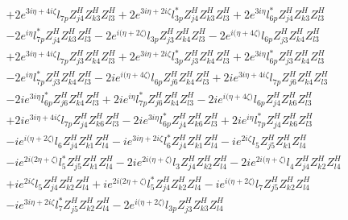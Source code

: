 \begin{align}
 &+2 e^{3 i \eta +4 i \zeta } l_{7p} Z_{{j 4}}^{H} Z_{{k 3}}^{H} Z_{{l 3}}^{H} +2 e^{3 i \eta +2 i \zeta } l_{3p}^* Z_{{j 4}}^{H} Z_{{k 3}}^{H} Z_{{l 3}}^{H} +2 e^{3 i \eta } l_{6p}^* Z_{{j 4}}^{H} Z_{{k 3}}^{H} Z_{{l 3}}^{H} \nonumber \\ 
 &-2 e^{i \eta } l_{7p}^* Z_{{j 4}}^{H} Z_{{k 3}}^{H} Z_{{l 3}}^{H} -2 e^{i \Big(\eta +2 \zeta \Big)} l_{3p} Z_{{j 3}}^{H} Z_{{k 4}}^{H} Z_{{l 3}}^{H} -2 e^{i \Big(\eta +4 \zeta \Big)} l_{6p} Z_{{j 3}}^{H} Z_{{k 4}}^{H} Z_{{l 3}}^{H} \nonumber \\ 
 &+2 e^{3 i \eta +4 i \zeta } l_{7p} Z_{{j 3}}^{H} Z_{{k 4}}^{H} Z_{{l 3}}^{H} +2 e^{3 i \eta +2 i \zeta } l_{3p}^* Z_{{j 3}}^{H} Z_{{k 4}}^{H} Z_{{l 3}}^{H} +2 e^{3 i \eta } l_{6p}^* Z_{{j 3}}^{H} Z_{{k 4}}^{H} Z_{{l 3}}^{H} \nonumber \\ 
 &-2 e^{i \eta } l_{7p}^* Z_{{j 3}}^{H} Z_{{k 4}}^{H} Z_{{l 3}}^{H} -2 i e^{i \Big(\eta +4 \zeta \Big)} l_{6p} Z_{{j 6}}^{H} Z_{{k 4}}^{H} Z_{{l 3}}^{H} +2 i e^{3 i \eta +4 i \zeta } l_{7p} Z_{{j 6}}^{H} Z_{{k 4}}^{H} Z_{{l 3}}^{H} \nonumber \\ 
 &-2 i e^{3 i \eta } l_{6p}^* Z_{{j 6}}^{H} Z_{{k 4}}^{H} Z_{{l 3}}^{H} +2 i e^{i \eta } l_{7p}^* Z_{{j 6}}^{H} Z_{{k 4}}^{H} Z_{{l 3}}^{H} -2 i e^{i \Big(\eta +4 \zeta \Big)} l_{6p} Z_{{j 4}}^{H} Z_{{k 6}}^{H} Z_{{l 3}}^{H} \nonumber \\ 
 &+2 i e^{3 i \eta +4 i \zeta } l_{7p} Z_{{j 4}}^{H} Z_{{k 6}}^{H} Z_{{l 3}}^{H} -2 i e^{3 i \eta } l_{6p}^* Z_{{j 4}}^{H} Z_{{k 6}}^{H} Z_{{l 3}}^{H} +2 i e^{i \eta } l_{7p}^* Z_{{j 4}}^{H} Z_{{k 6}}^{H} Z_{{l 3}}^{H} \nonumber \\ 
 &-i e^{i \Big(\eta +2 \zeta \Big)} l_6 Z_{{j 4}}^{H} Z_{{k 1}}^{H} Z_{{l 4}}^{H} -i e^{3 i \eta +2 i \zeta } l_6^* Z_{{j 4}}^{H} Z_{{k 1}}^{H} Z_{{l 4}}^{H} -i e^{2 i \zeta } l_5 Z_{{j 5}}^{H} Z_{{k 1}}^{H} Z_{{l 4}}^{H} \nonumber \\ 
 &-i e^{2 i \Big(2 \eta +\zeta \Big)} l_5^* Z_{{j 5}}^{H} Z_{{k 1}}^{H} Z_{{l 4}}^{H} -2 i e^{2 i \Big(\eta +\zeta \Big)} l_3 Z_{{j 4}}^{H} Z_{{k 2}}^{H} Z_{{l 4}}^{H} -2 i e^{2 i \Big(\eta +\zeta \Big)} l_4 Z_{{j 4}}^{H} Z_{{k 2}}^{H} Z_{{l 4}}^{H} \nonumber \\ 
 &+i e^{2 i \zeta } l_5 Z_{{j 4}}^{H} Z_{{k 2}}^{H} Z_{{l 4}}^{H} +i e^{2 i \Big(2 \eta +\zeta \Big)} l_5^* Z_{{j 4}}^{H} Z_{{k 2}}^{H} Z_{{l 4}}^{H} -i e^{i \Big(\eta +2 \zeta \Big)} l_7 Z_{{j 5}}^{H} Z_{{k 2}}^{H} Z_{{l 4}}^{H} \nonumber \\ 
 &-i e^{3 i \eta +2 i \zeta } l_7^* Z_{{j 5}}^{H} Z_{{k 2}}^{H} Z_{{l 4}}^{H} -2 e^{i \Big(\eta +2 \zeta \Big)} l_{3p} Z_{{j 3}}^{H} Z_{{k 3}}^{H} Z_{{l 4}}^{H} \nonumber \\ 

\end{align}
